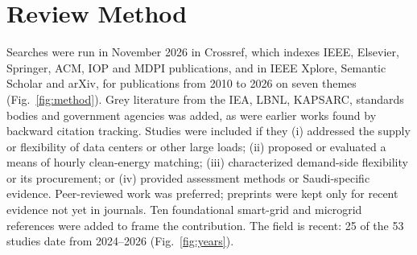 \documentclass[conference]{IEEEtran}
\begin{document}
\section{Review Method}
Searches were run in November 2026 in Crossref, which indexes IEEE, Elsevier, Springer, ACM, IOP and MDPI publications, and in IEEE Xplore, Semantic Scholar and arXiv, for publications from 2010 to 2026 on seven themes (Fig.~\ref{fig:method}). Grey literature from the IEA, LBNL, KAPSARC, standards bodies and government agencies was added, as were earlier works found by backward citation tracking. Studies were included if they (i) addressed the supply or flexibility of data centers or other large loads; (ii) proposed or evaluated a means of hourly clean-energy matching; (iii) characterized demand-side flexibility or its procurement; or (iv) provided assessment methods or Saudi-specific evidence. Peer-reviewed work was preferred; preprints were kept only for recent evidence not yet in journals. Ten foundational smart-grid and microgrid references were added to frame the contribution. The field is recent: 25 of the 53 studies date from 2024--2026 (Fig.~\ref{fig:years}).
\end{document}
